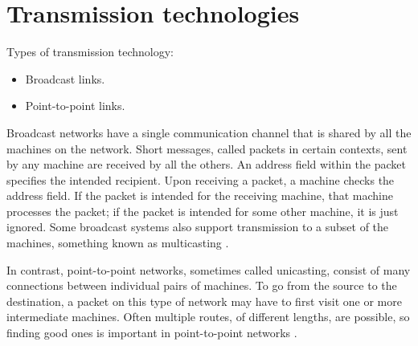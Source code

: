 \section{Transmission technologies}

Types of transmission technology:
\begin{itemize}
  \item Broadcast links.
  \item Point-to-point links.
\end{itemize}

Broadcast networks have a single communication channel 
that is shared by all the machines on the network. 
Short messages, called packets in certain contexts, 
sent by any machine are received by all the others. An 
address field within the packet specifies the intended 
recipient. Upon receiving a packet, a machine checks the 
address field. If the packet is intended for the receiving 
machine, that machine processes the packet; if the 
packet is intended for some other machine, 
it is just ignored. Some broadcast systems also 
support transmission to a subset of the machines, 
something known as multicasting \cite{Tanembaum:2003cn}. 

In contrast, point-to-point networks, sometimes 
called unicasting, consist of
many connections between individual pairs of machines. To go 
from the source to the destination, a packet on this 
type of network may have to first visit one or more 
intermediate machines. Often multiple routes, of 
different lengths, are possible, so finding good 
ones is important in point-to-point 
networks \cite{Tanembaum:2003cn}.

